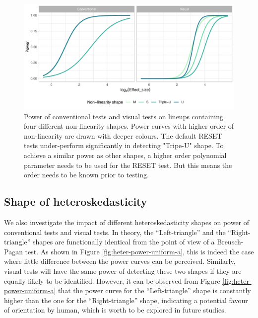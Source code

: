 \documentclass[]{interact}
\theoremstyle{plain}%
\theoremstyle{definition}
\theoremstyle{remark}
\begin{document}
\begin{figure}

{\centering \includegraphics[width=1\linewidth]{paper_comparison_files/figure-latex/poly-power-uniform-j-1} 

}

\caption{Power of conventional tests and visual tests on lineups containing four different non-linearity shapes. Power curves with higher order of non-linearity are drawn with deeper colours. The default RESET tests under-perform significantly in detecting "Tripe-U" shape. To achieve a similar power as other shapes, a higher order polynomial parameter needs to be used for the RESET test. But this means the order needs to be known prior to testing.}\label{fig:poly-power-uniform-j}
\end{figure}

\hypertarget{shape-of-heteroskedasticity}{%
\subsection{Shape of
heteroskedasticity}\label{shape-of-heteroskedasticity}}

We also investigate the impact of different heteroskedasticity shapes on
power of conventional tests and visual tests. In theory, the
``Left-triangle'' and the ``Right-triangle'' shapes are functionally
identical from the point of view of a Breusch-Pagan test. As shown in
Figure \ref{fig:heter-power-uniform-a}, this is indeed the case where
little difference between the power curves can be perceived. Similarly,
visual tests will have the same power of detecting these two shapes if
they are equally likely to be identified. However, it can be observed
from Figure \ref{fig:heter-power-uniform-a} that the power curve for the
``Left-triangle'' shape is constantly higher than the one for the
``Right-triangle'' shape, indicating a potential favour of orientation
by human, which is worth to be explored in future studies.
\end{document}
